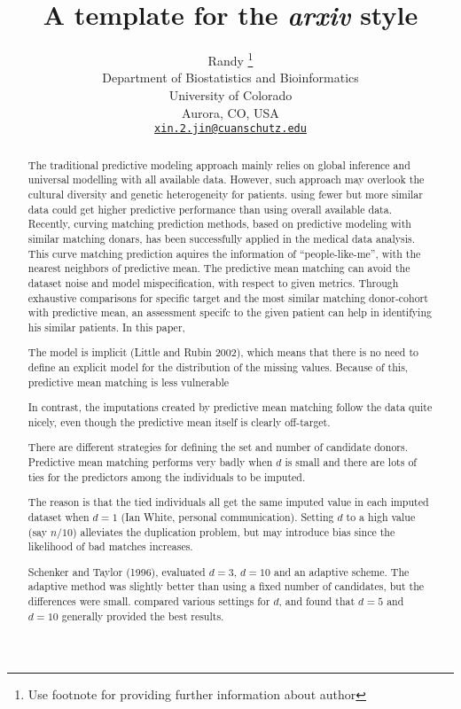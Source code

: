 \documentclass{article}
\title{A template for the \emph{arxiv} style}
\author{
    Randy
    \thanks{Use footnote for providing further information about author}
   \\
    Department of Biostatistics and Bioinformatics \\
    University of Colorado \\
  Aurora, CO, USA \\
  \texttt{\href{mailto:xin.2.jin@cuanschutz.edu}{\nolinkurl{xin.2.jin@cuanschutz.edu}}} \\
  }
\begin{document}
\maketitle


\begin{abstract}
The traditional predictive modeling approach mainly relies on global
inference and universal modelling with all available data. However, such
approach may overlook the cultural diversity and genetic heterogeneity
for patients. using fewer but more similar data could get higher
predictive performance than using overall available data. Recently,
curving matching prediction methods, based on predictive modeling with
similar matching donars, has been successfully applied in the medical
data analysis. This curve matching prediction aquires the information of
``people-like-me'', with the nearest neighbors of predictive mean. The
predictive mean matching can avoid the dataset noise and model
mispecification, with respect to given metrics. Through exhaustive
comparisons for specific target and the most similar matching
donor-cohort with predictive mean, an assessment specifc to the given
patient can help in identifying his similar patients. In this paper,

The model is implicit (Little and Rubin 2002), which means that there is
no need to define an explicit model for the distribution of the missing
values. Because of this, predictive mean matching is less vulnerable

In contrast, the imputations created by predictive mean matching follow
the data quite nicely, even though the predictive mean itself is clearly
off-target.

There are different strategies for defining the set and number of
candidate donors. Predictive mean matching performs very badly when
\(d\) is small and there are lots of ties for the predictors among the
individuals to be imputed.

The reason is that the tied individuals all get the same imputed value
in each imputed dataset when \(d = 1\) (Ian White, personal
communication). Setting \(d\) to a high value (say \(n/10\)) alleviates
the duplication problem, but may introduce bias since the likelihood of
bad matches increases.

Schenker and Taylor (1996), evaluated \(d = 3\), \(d = 10\) and an
adaptive scheme. The adaptive method was slightly better than using a
fixed number of candidates, but the differences were small. compared
various settings for \(d\), and found that \(d = 5\) and \(d = 10\)
generally provided the best results.
\end{abstract}
\end{document}
